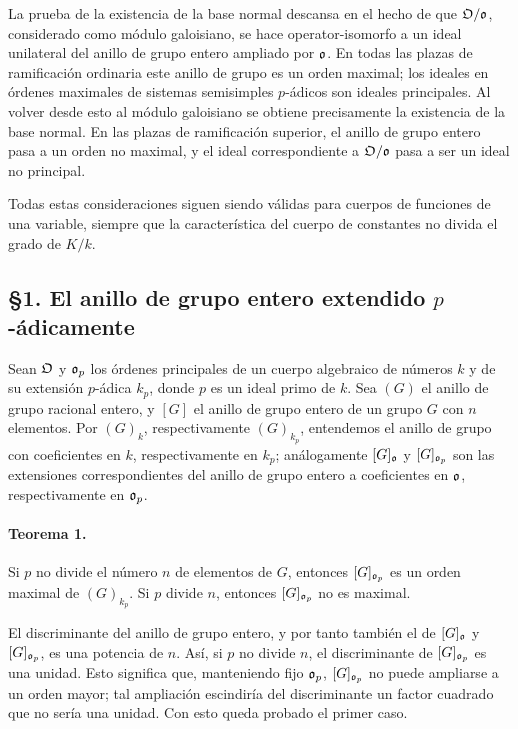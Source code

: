 La prueba de la existencia de la base normal descansa en el hecho de que \(\mathfrak O/\mathfrak o\), considerado como módulo galoisiano, se hace operator-isomorfo a un ideal unilateral del anillo de grupo entero ampliado por \(\mathfrak o\). En todas las plazas de ramificación ordinaria este anillo de grupo es un orden maximal; los ideales en órdenes maximales de sistemas semisimples \(p\)-ádicos son ideales principales. Al volver desde esto al módulo galoisiano se obtiene precisamente la existencia de la base normal. En las plazas de ramificación superior, el anillo de grupo entero pasa a un orden no maximal, y el ideal correspondiente a \(\mathfrak O/\mathfrak o\) pasa a ser un ideal no principal.

Todas estas consideraciones siguen siendo válidas para cuerpos de funciones de una variable, siempre que la característica del cuerpo de constantes no divida el grado de \(K/k\).

\subsection*{§1. El anillo de grupo entero extendido \(p\)-ádicamente}

Sean \(\mathfrak O\) y \(\mathfrak o_p\) los órdenes principales de un cuerpo algebraico de números \(k\) y de su extensión \(p\)-ádica \(k_p\), donde \(p\) es un ideal primo de \(k\). Sea \((G)\) el anillo de grupo racional entero, y \([G]\) el anillo de grupo entero de un grupo \(G\) con \(n\) elementos. Por \((G)_k\), respectivamente \((G)_{k_p}\), entendemos el anillo de grupo con coeficientes en \(k\), respectivamente en \(k_p\); análogamente \([G]_{\mathfrak o}\) y \([G]_{\mathfrak o_p}\) son las extensiones correspondientes del anillo de grupo entero a coeficientes en \(\mathfrak o\), respectivamente en \(\mathfrak o_p\).

\paragraph{Teorema 1.}
Si \(p\) no divide el número \(n\) de elementos de \(G\), entonces \([G]_{\mathfrak o_p}\) es un orden maximal de \((G)_{k_p}\). Si \(p\) divide \(n\), entonces \([G]_{\mathfrak o_p}\) no es maximal.

El discriminante del anillo de grupo entero, y por tanto también el de \([G]_{\mathfrak o}\) y \([G]_{\mathfrak o_p}\), es una potencia de \(n\). Así, si \(p\) no divide \(n\), el discriminante de \([G]_{\mathfrak o_p}\) es una unidad. Esto significa que, manteniendo fijo \(\mathfrak o_p\), \([G]_{\mathfrak o_p}\) no puede ampliarse a un orden mayor; tal ampliación escindiría del discriminante un factor cuadrado que no sería una unidad. Con esto queda probado el primer caso.

